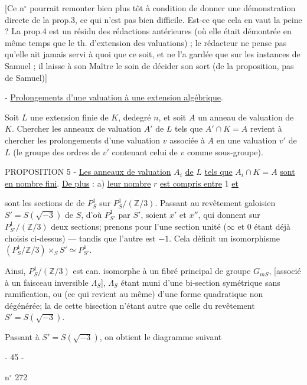 [Ce n$^\circ$ pourrait remonter bien plus tôt à condition de donner une démonstration directe de la prop.3, ce qui n'est pas bien difficile. Est-ce que cela en vaut la peine ? La prop.4 est un résidu des rédactions antérieures (où elle était démontrée en même temps que le th. d'extension des valuations) ; le rédacteur ne pense pas qu'elle ait jamais servi à quoi que ce soit, et ne l'a gardée que sur les instances de Samuel ; il laisse à son Maître le soin de décider son sort (de la proposition, pas de Samuel)]

 - \uline{Prolongements d'une valuation à une extension algébrique}.

Soit $L$ une extension finie de $K$, dedegré $n$, et soit $A$ un anneau de valuation de $K$. Chercher les anneaux de valuation $A'$ de $L$ tels que $A'\cap K=A$ revient à chercher les prolongements d'une valuation $v$ associée à $A$ en une valuation $v'$ de $L$ (le groupe des ordres de $v'$ contenant celui de $v$ comme sous-groupe).

PROPOSITION 5 - \uline{Les anneaux de valuation} $A_i$ \uline{de} $L$ \uline{tels que} $A_i\cap K=A$ \uline{sont en nombre fini}. \uline{De plus} : a) \uline{leur nombre} $r$ \uline{est compris entre} 1 \uline{et}

sont les sections de  de $P^1_S$ sur $P^1_S/(\mathbb Z/3)$. Passant au revêtement galoisien $S'=S(\sqrt{-3})$ de $S$, d'où  $P^1_{S'}$    par $\overline{S'}$, soient $x'$ et $x''$, qui donnent sur $P^1_{S'}/(\mathbb Z/3)$ deux sections; prenons pour l'une   section unité ($\infty$ et $0$ étant déjà choisis ci-dessus) --- tandis que l'autre est $-1$. Cela définit un isomorphisme $(P^1_S/\mathbb Z/3)\times_S S'\simeq P^1_{S'}$.

Ainsi, $P^1_S/(\mathbb Z/3)$ est can. isomorphe à un fibré principal de groupe $G_{mS}$, [associé à un faisceau inversible $\Lambda_S$], $\Lambda_S$ étant muni d'une bi-section  symétrique sans ramification, ou (ce qui revient au même) d'une forme quadratique non dégénérée; la  de cette bisection n'étant autre que celle du revêtement $S'=S(\sqrt{-3})$.

Passant à $S'=S(\sqrt{-3})$, on obtient le diagramme suivant

\begin{center}- 45 -\end{center}
\hfill n$^\circ$ 272

